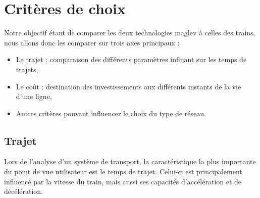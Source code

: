\documentclass[12pt, a4paper, onecolumn]{article}
\renewcommand{\tab}{\tabto{15px}}
\begin{document}
\pagebreak %
\section{Critères de choix}

\tab Notre objectif étant de comparer les deux technologies maglev à celles des trains, nous allons donc les comparer sur trois axes principaux :
\begin{itemize}
  \item Le trajet : comparaison des différents paramètres influant sur les temps de trajets,
  \item Le coût : destination des investissements aux différents instants de la vie d’une ligne,
  \item Autres critères pouvant influencer le choix du type de réseau.
\end{itemize}

\subsection{Trajet}
\tab Lors de l’analyse d’un système de transport, la caractéristique la plus importante du point de vue utilisateur est le temps de trajet.
Celui-ci est principalement influencé par la vitesse du train, mais aussi ses capacités d’accélération et de décélération.
\end{document}
